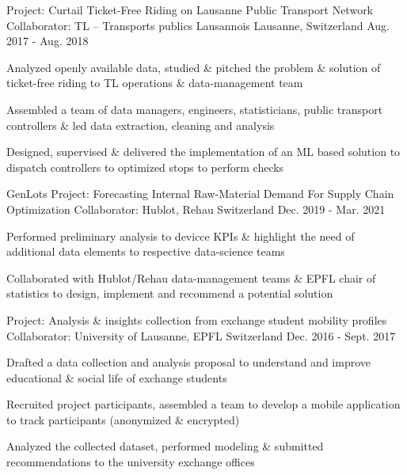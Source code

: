 
\begin{cventries}

 \cventry
    {Project: Curtail Ticket-Free Riding on Lausanne Public Transport Network} %
    {Collaborator: TL – Transports publics Lausannois} %
    {Lausanne, Switzerland} %
    {Aug. 2017 - Aug. 2018} %
    {
      \begin{cvitems} %
       \item {Analyzed openly available data, studied \& pitched the problem \& solution of ticket-free riding to TL operations \& data-management team}
       \item {Assembled a team of data managers, engineers, statisticians, public transport controllers \& led data extraction, cleaning and analysis}
       \item {Designed, supervised \& delivered the implementation of an ML based solution to dispatch controllers to optimized stops to perform checks}
      \end{cvitems}
    }
    
  \cventry
    {GenLots Project: Forecasting Internal Raw-Material Demand For Supply Chain Optimization} %
    {Collaborator: Hublot, Rehau} %
    {Switzerland} %
    {Dec. 2019 - Mar. 2021} %
    {
      \begin{cvitems} %
       \item {Performed preliminary analysis to devicce KPIs \& highlight the need of additional data elements to respective data-science teams}
       \item {Collaborated with Hublot/Rehau data-management teams \& EPFL chair of statistics to design, implement and recommend a potential solution}
      \end{cvitems}
    }
    
    
     \cventry
    {Project: Analysis \& insights collection from exchange student mobility profiles} %
    {Collaborator: University of Lausanne, EPFL} %
    {Switzerland} %
    {Dec. 2016 - Sept. 2017} %
    {
      \begin{cvitems} %
       \item {Drafted a data collection and analysis proposal to understand and improve educational \& social life of exchange students}
       \item {Recruited project participants, assembled a team to develop a mobile application to track participants (anonymized \& encrypted)}
       \item {Analyzed the collected dataset, performed modeling \& submitted recommendations to the university exchange offices}
      \end{cvitems}
    }

\end{cventries}
